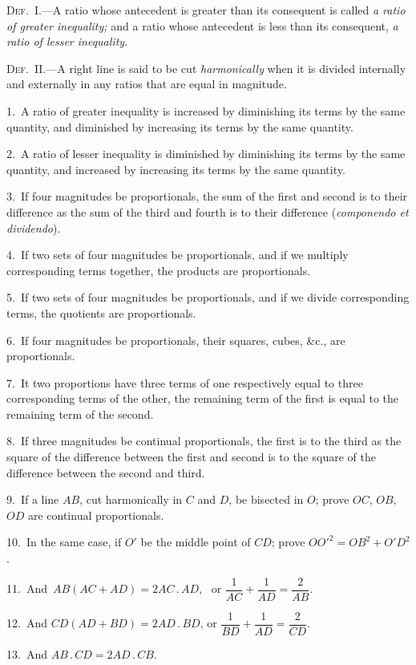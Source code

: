 \documentclass[oneside]{book}
\begin{document}
\begin{footnotesize}
\textsc{Def.~I.}---A ratio whose antecedent is greater than its consequent
is called \emph{a ratio of greater inequality;} and a ratio whose
antecedent is less than its consequent, \emph{a ratio of lesser inequality.}

\textsc{Def.~II\@.}---A right line is said to be cut \emph{harmonically} when it is
divided internally and externally in any ratios that are equal in
magnitude.

1.~A ratio of greater inequality is increased by diminishing its
terms by the same quantity, and diminished by increasing its
terms by the same quantity.

2.~A ratio of lesser inequality is diminished by diminishing its
terms by the same quantity, and increased by increasing its terms
by the same quantity.

3.~If four magnitudes be proportionals, the sum of the first and
second is to their difference as the sum of the third and fourth is
to their difference (\emph{componendo et dividendo}).

4.~If two sets of four magnitudes be proportionals, and if we
multiply corresponding terms together, the products are proportionals.


5.~If two sets of four magnitudes be proportionals, and if we
divide corresponding terms, the quotients are proportionals.

6.~If four magnitudes be proportionals, their squares, cubes,
\&c., are proportionals.

7.~It two proportions have three terms of one respectively
equal to three corresponding terms of the other, the remaining
term of the first is equal to the remaining term of the second.

8.~If three magnitudes be continual proportionals, the first is
to the third as the square of the difference between the first and
second is to the square of the difference between the second and
third.

9.~If a line $AB$, cut harmonically in $C$ and $D$, be bisected in
$O$; prove $OC$, $OB$, $OD$ are continual proportionals.

10.~In the same case, if $O'$ be the middle point of $CD$; prove
$OO'^2 = OB^2 + O'D^2$.

11.~And \,$AB (AC + AD) = 2AC\,.\,AD$, \ or
$\dfrac{1}{AC}+\dfrac{1}{AD}=\dfrac{2}{AB}$.

12.~And $CD (AD + BD) = 2AD\,.\,BD$, or
$\dfrac{1}{BD}+\dfrac{1}{AD}=\dfrac{2}{CD}$.

13.~And $AB\,.\,CD = 2AD\,.\,CB$.
\par\end{footnotesize}
\end{document}
